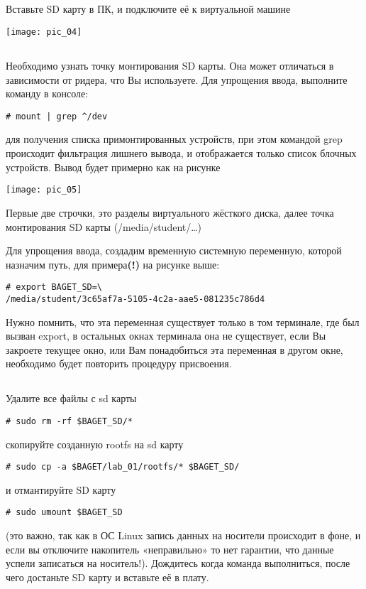 \subsection{}Вставьте SD карту в ПК, и подключите её к виртуальной машине
\begin{center}
	\texttt{[image: pic\_04]}
\end{center}

\subsection{}Необходимо узнать точку монтирования SD карты. Она может отличаться в зависимости от ридера, что Вы используете. Для упрощения ввода, выполните команду в консоле:
\begin{lstlisting}[style=bash]
# mount | grep ^/dev
\end{lstlisting}
для получения списка примонтированных устройств, при этом командой grep происходит фильтрация лишнего вывода, и отображается только список блочных устройств. Вывод будет примерно как на рисунке

\begin{center}
\texttt{[image: pic\_05]}
\end{center}

Первые две строчки, это разделы виртуального жёсткого диска, далее точка монтирования SD карты (/media/student/…)

Для упрощения ввода, создадим временную системную переменную, которой назначим путь, для примера\textbf{(!)} на рисунке выше:
\begin{lstlisting}[style=bash]
# export BAGET_SD=\
/media/student/3c65af7a-5105-4c2a-aae5-081235c786d4
\end{lstlisting}

Нужно помнить, что эта переменная существует только в том терминале, где был вызван export, в остальных окнах терминала она не существует, если Вы закроете текущее окно, или Вам понадобиться эта переменная в другом окне, необходимо будет повторить процедуру присвоения.

\subsection{}Удалите все файлы с sd карты
\begin{lstlisting}[style=bash]
# sudo rm -rf $BAGET_SD/*
\end{lstlisting}
скопируйте созданную rootfs на sd карту
\begin{lstlisting}[style=bash]
# sudo cp -a $BAGET/lab_01/rootfs/* $BAGET_SD/
\end{lstlisting}
и отмантируйте SD карту 
\begin{lstlisting}[style=bash]
# sudo umount $BAGET_SD
\end{lstlisting}
(это важно, так как в ОС Linux запись данных на носители происходит в фоне, и если вы отключите накопитель «неправильно» то нет гарантии, что данные успели записаться на носитель!).
Дождитесь когда команда выполниться, после чего достаньте SD карту и вставьте её в плату.

